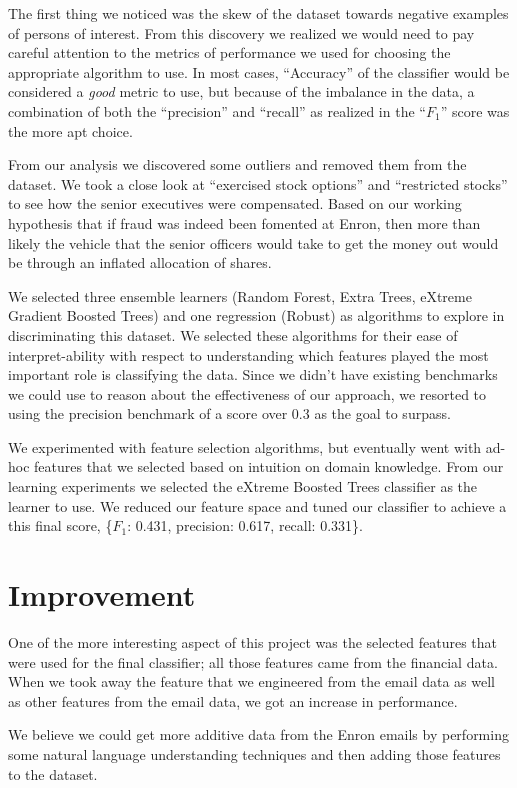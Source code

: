 \documentclass[twoside,openright,titlepage,numbers=noenddot,headinclude,%
               footinclude=true,cleardoublepage=empty,abstractoff,BCOR=5mm,%
               paper=a4,fontsize=11pt,ngerman,american]{scrreprt}
\numberwithin{theorem}{chapter}
\numberwithin{definition}{chapter}
\numberwithin{algorithm}{chapter}
\numberwithin{figure}{chapter}
\numberwithin{table}{chapter}
\numberwithin{equation}{chapter}
\begin{document}
The first thing we noticed was the skew of the dataset towards negative examples of persons of interest. From this discovery we realized we would need to pay careful attention to the metrics of performance we used for choosing the appropriate algorithm to use. In most cases, ``Accuracy'' of the classifier would be considered a \textit{good} metric to use, but because of the imbalance in the data, a combination of both the ``precision'' and ``recall'' as realized in the ``$F_1$'' score was the more apt choice.

From our analysis we discovered some outliers and removed them from the dataset. We took a close look at ``exercised stock options'' and ``restricted stocks'' to see how the senior executives were compensated. Based on our working hypothesis that if fraud was indeed been fomented at Enron, then more than likely the vehicle that the senior officers would take to get the money out would be through an inflated allocation of shares. 

We selected three ensemble learners (Random Forest, Extra Trees, eXtreme Gradient Boosted Trees) and one regression (Robust) as algorithms to explore in discriminating this dataset. We selected these algorithms for their ease of interpret-ability with respect to understanding which features played the most important role is classifying the data. Since we didn't have existing benchmarks we could use to reason about the effectiveness of our approach, we resorted to using the precision benchmark of a score over 0.3 as the goal to surpass.

We experimented with feature selection algorithms, but eventually went with ad-hoc features that we selected based on intuition on domain knowledge. From our learning experiments we selected the eXtreme Boosted Trees classifier as the learner to use. We reduced our feature space and tuned our classifier to achieve a this final score, \{$F_1$: 0.431, precision: 0.617, recall: 0.331\}.

\section*{Improvement}
One of the more interesting aspect of this project was the selected features that were used for the final classifier; all those features came from the financial data. When we took away the feature that we engineered from the email data as well as other features from the email data, we got an increase in performance. 

We believe we could get more additive data from the Enron emails by performing some natural language understanding techniques and then adding those features to the dataset.
\end{document}
